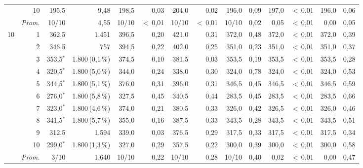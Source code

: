 \documentclass[11pt,a4paper]{article}
\begin{document}
\begin{table}[htbp]
{\begin{tabular}{rr rr rr rr rr rr rr}
 & 10 & 195{,}5 & 9{,}48 & 198{,}5 & 0{,}03 & 204{,}0 & 0{,}02 & 196{,}0 & 0{,}09 & 197{,}0 & $<$\,0{,}01 & 196{,}0 & 0{,}06 \\
\cmidrule(l){2-14}
 & \emph{Prom.} & 10/10 & 4{,}55 & 10/10 & $<$\,0{,}01 & 10/10 & $<$\,0{,}01 & 10/10 & 0{,}02 & 0{,}05 & $<$\,0{,}01 & 0{,}00 & 0{,}05 \\
\midrule
10 & 1 & 362{,}5 & 1.451 & 396{,}5 & 0{,}20 & 421{,}0 & 0{,}31 & 372{,}0 & 0{,}48 & 372{,}0 & $<$\,0{,}01 & 372{,}0 & 0{,}39 \\
 & 2 & 346{,}5 & 757 & 394{,}5 & 0{,}22 & 402{,}0 & 0{,}25 & 351{,}0 & 0{,}23 & 351{,}0 & $<$\,0{,}01 & 351{,}0 & 0{,}37 \\
 & 3 & 353{,}5$^{*}$ & 1.800\,{\scriptsize(0{,}1\,\%)} & 374{,}5 & 0{,}10 & 381{,}5 & 0{,}03 & 353{,}5 & 0{,}19 & 353{,}5 & $<$\,0{,}01 & 353{,}5 & 0{,}28 \\
 & 4 & 320{,}5$^{*}$ & 1.800\,{\scriptsize(5{,}0\,\%)} & 344{,}0 & 0{,}24 & 338{,}0 & 0{,}30 & 324{,}0 & 0{,}78 & 324{,}0 & $<$\,0{,}01 & 324{,}0 & 0{,}53 \\
 & 5 & 344{,}5$^{*}$ & 1.800\,{\scriptsize(5{,}1\,\%)} & 376{,}0 & 0{,}31 & 396{,}0 & 0{,}31 & 346{,}5 & 0{,}45 & 346{,}5 & $<$\,0{,}01 & 346{,}5 & 0{,}59 \\
 & 6 & 276{,}0$^{*}$ & 1.800\,{\scriptsize(5{,}8\,\%)} & 327{,}5 & 0{,}45 & 340{,}5 & 0{,}44 & 283{,}5 & 0{,}45 & 283{,}5 & $<$\,0{,}01 & 283{,}5 & 0{,}66 \\
 & 7 & 323{,}0$^{*}$ & 1.800\,{\scriptsize(4{,}6\,\%)} & 374{,}0 & 0{,}21 & 380{,}5 & 0{,}33 & 326{,}0 & 0{,}42 & 326{,}5 & $<$\,0{,}01 & 326{,}0 & 0{,}46 \\
 & 8 & 341{,}5$^{*}$ & 1.800\,{\scriptsize(5{,}7\,\%)} & 355{,}0 & 0{,}16 & 387{,}5 & 0{,}33 & 343{,}5 & 0{,}28 & 343{,}5 & $<$\,0{,}01 & 343{,}5 & 0{,}51 \\
 & 9 & 312{,}5 & 1.594 & 339{,}0 & 0{,}03 & 376{,}5 & 0{,}29 & 317{,}5 & 0{,}33 & 317{,}5 & $<$\,0{,}01 & 317{,}5 & 0{,}34 \\
 & 10 & 299{,}0$^{*}$ & 1.800\,{\scriptsize(1{,}3\,\%)} & 327{,}0 & 0{,}29 & 357{,}5 & 0{,}22 & 300{,}0 & 0{,}39 & 300{,}0 & $<$\,0{,}01 & 300{,}0 & 0{,}58 \\
\cmidrule(l){2-14}
 & \emph{Prom.} & 3/10 & 1.640 & 10/10 & 0{,}22 & 10/10 & 0{,}28 & 10/10 & 0{,}40 & 0{,}02 & $<$\,0{,}01 & 0{,}00 & 0{,}47 \\
\bottomrule
\end{tabular}%
}
\end{table}
\end{document}
